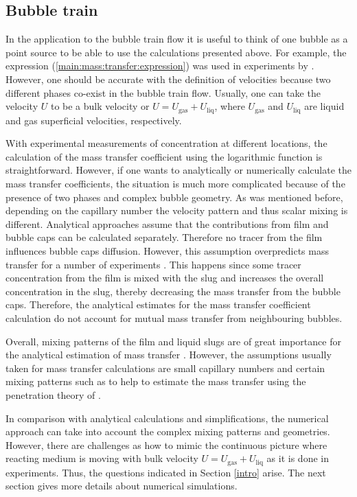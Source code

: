 \documentclass{article}
\newcommand{\uliq}{U_{\mathrm{liq}}}
\newcommand{\ugas}{U_{\mathrm{gas}}}
\begin{document}
\subsection{Bubble train}
In the application to the bubble train flow it is useful to think of one bubble as a point
source to be able to use the calculations presented above. For example, the expression
(\ref{main:mass:transfer:expression}) was used in experiments by
\citet{bercic-mass}. However, one should be accurate with the definition of velocities because two
different phases co-exist in the bubble train flow. Usually, one can take the velocity $U$ to be
a bulk velocity or $U=\ugas+\uliq$, where $\ugas$ and $\uliq$ are liquid and gas
superficial velocities, respectively. 

With experimental measurements of concentration at different locations, the calculation
of the mass transfer coefficient using the logarithmic function is straightforward.
However, if one wants to analytically or numerically calculate the mass transfer coefficients, the
situation is much more complicated because of the presence of two phases and complex bubble
geometry. As was mentioned before, depending on the capillary
number the velocity pattern and thus scalar mixing is different. Analytical approaches
\cite{irandoust,vanbaten-circular} assume that the
contributions from film and bubble caps can be calculated separately. Therefore no tracer from the film influences bubble caps diffusion.   However, this assumption overpredicts mass transfer for a number of experiments \cite{irandoust}. This happens since some tracer
concentration from the film is mixed with the slug and increases the overall concentration in the slug, thereby decreasing
the mass transfer from the bubble caps.
Therefore, the analytical estimates for the mass transfer coefficient calculation  do not account for mutual mass
transfer from neighbouring bubbles.

Overall, mixing patterns of the film and liquid slugs are of great importance for the analytical
estimation of mass transfer \cite{yue-mass}. However, the assumptions usually taken for 
mass transfer calculations are small capillary numbers and certain mixing patterns such as to help to
estimate the mass transfer using the penetration theory of \citet{higbie}.

In comparison with analytical calculations and simplifications, the numerical approach can take into
account the complex mixing patterns and geometries. However, there are challenges as  how to
mimic the continuous picture where reacting medium is moving with bulk velocity $U=\ugas+\uliq$  as it is done in
experiments. Thus, the questions indicated in Section \ref{intro} arise.  The next section gives more
 details about numerical simulations.
 
\end{document}
